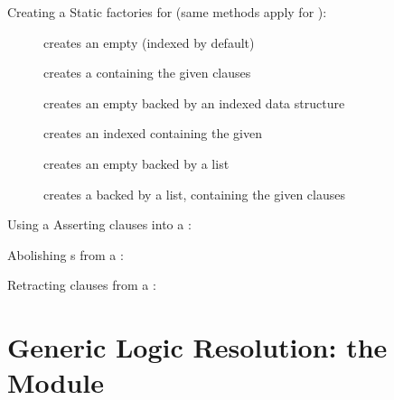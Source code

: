 \documentclass[handout]{beamer}
\begin{document}
\begin{frame}[allowframebreaks]{Creating a }
    Static factories for  (same methods apply for ):
    \begin{description}
        \item[] creates an empty  (indexed by default)
        \item[] creates a  containing the given clauses
        \item[] creates an empty  backed by an indexed data structure
        \item[] creates an indexed  containing the given 
        \item[] creates an empty  backed by a list
        \item[] creates a  backed by a list, containing the given clauses
    \end{description}
\end{frame}

\begin{frame}[allowframebreaks]{Using a }
    Asserting clauses into a :

    \framebreak

    Abolishing s from a :

    \framebreak

    Retracting clauses from a :
\end{frame}

\section{Generic Logic Resolution: the  Module}
\end{document}

